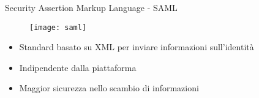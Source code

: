 \begin{frame}[t,noframenumbering]{Security Assertion Markup Language - SAML}
\begin{figure}[h]
\centering
\texttt{[image: saml]}
\end{figure}

\begin{itemize}
\item Standard basato su XML per inviare informazioni sull'identità
\item Indipendente dalla piattaforma
\item Maggior sicurezza nello scambio di informazioni
\end{itemize}
\end{frame}